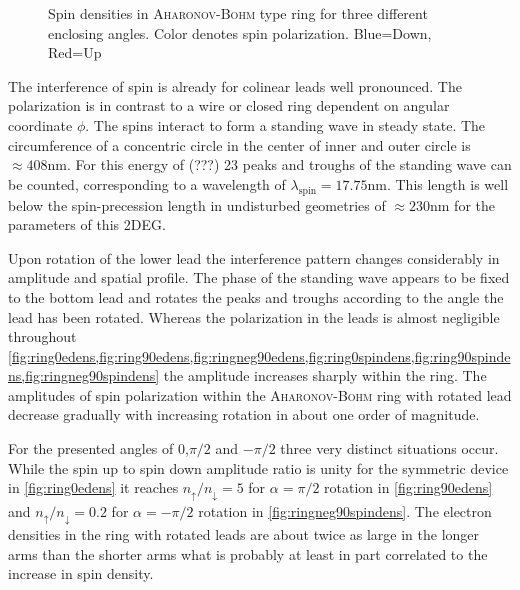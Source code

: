 \begin{figure}[h!]
\caption{Spin densities in \textsc{Aharonov-Bohm} type ring for three different enclosing angles. Color denotes spin polarization. Blue=Down, Red=Up}
\end{figure}
The interference of spin is already for colinear leads well pronounced. The polarization is in contrast to a wire or closed ring \cite{PhysRevB.82.165322} dependent on angular coordinate $\phi$.
The spins interact to form a standing wave in steady state. The circumference of a concentric circle in the center of inner and outer circle is $\approx 408$nm. For this energy of (???) 23 peaks and troughs of the standing wave can be counted, corresponding to a wavelength of $\lambda_{\text{spin}}=17.75$nm. This length is well below the spin-precession length in undisturbed geometries of $\approx230$nm for the parameters of this 2DEG.\par
Upon rotation of the lower lead the interference pattern changes considerably in amplitude and spatial profile. The phase of the standing wave appears to be fixed to the bottom lead and rotates the peaks and troughs according to the angle the lead has been rotated. Whereas the polarization in the leads is almost negligible throughout \cref{fig:ring0edens,fig:ring90edens,fig:ringneg90edens,fig:ring0spindens,fig:ring90spindens,fig:ringneg90spindens} the amplitude increases sharply within the ring. The amplitudes of spin polarization within the \textsc{Aharonov-Bohm} ring with rotated lead decrease gradually with increasing rotation in about one order of magnitude.\par
For the presented angles of 0,$\pi/2$ and $-\pi/2$ three very distinct situations occur. While the spin up to spin down amplitude ratio is unity for the symmetric device in \cref{fig:ring0edens} it reaches $n_{\uparrow}/n_{\downarrow}=5$ for $\alpha=\pi/2$ rotation in \cref{fig:ring90edens} and $n_{\uparrow}/n_{\downarrow}=0.2$ for $\alpha=-\pi/2$ rotation in \cref{fig:ringneg90spindens}. The electron densities in the ring with rotated leads are about twice as large in the longer arms than the shorter arms what is probably at least in part correlated to the increase in spin density.\par
